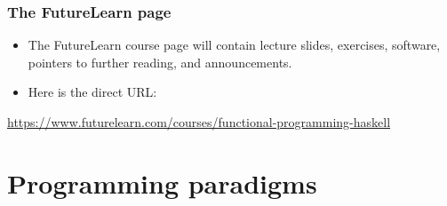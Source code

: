 \documentclass{beamer}
\begin{document}

\begin{frame}[fragile]
\frametitle{The FutureLearn page}

\begin{itemize}
\item The FutureLearn course page will contain lecture slides, exercises,
  software, pointers to further reading, and announcements.
\item Here is the direct URL:
\end{itemize}

\url{https://www.futurelearn.com/courses/functional-programming-haskell}

\end{frame}
%
%

\section{Programming paradigms}
\end{document}
